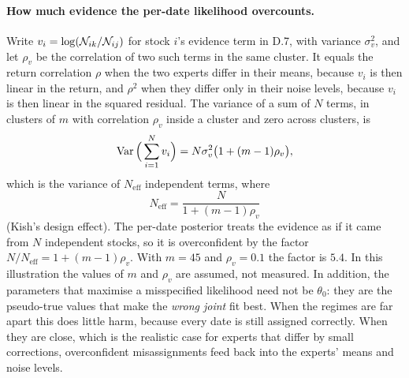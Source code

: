 \paragraph{How much evidence the per-date likelihood overcounts.} Write $v_i=\log(\mathcal{N}_{ik}/\mathcal{N}_{ij})$ for stock $i$'s evidence term in D.7, with variance $\sigma_v^2$, and let $\rho_v$ be the correlation of two such terms in the same cluster. It equals the return correlation $\rho$ when the two experts differ in their means, because $v_i$ is then linear in the return, and $\rho^2$ when they differ only in their noise levels, because $v_i$ is then linear in the squared residual. The variance of a sum of $N$ terms, in clusters of $m$ with correlation $\rho_v$ inside a cluster and zero across clusters, is
\begin{equation*}
\operatorname{Var}\Big(\sum_{i=1}^Nv_i\Big)=N\sigma_v^2\big(1+(m-1)\rho_v\big),
\end{equation*}
which is the variance of $N_{\text{eff}}$ independent terms, where
\begin{equation*}
N_{\text{eff}}=\frac{N}{1+(m-1)\rho_v}
\end{equation*}
(Kish's design effect). The per-date posterior treats the evidence as if it came from $N$ independent stocks, so it is overconfident by the factor $N/N_{\text{eff}}=1+(m-1)\rho_v$. With $m=45$ and $\rho_v=0.1$ the factor is $5.4$. In this illustration the values of $m$ and $\rho_v$ are assumed, not measured. In addition, the parameters that maximise a misspecified likelihood need not be $\theta_0$: they are the pseudo-true values that make the \emph{wrong joint} fit best. When the regimes are far apart this does little harm, because every date is still assigned correctly. When they are close, which is the realistic case for experts that differ by small corrections, overconfident misassignments feed back into the experts' means and noise levels.

